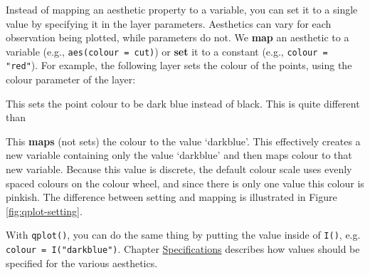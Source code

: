 
Instead of mapping an aesthetic property to a variable, you can set it
to a single value by specifying it in the layer parameters. Aesthetics
can vary for each observation being plotted, while parameters do not. We
\textbf{map} an aesthetic to a variable (e.g.,
\texttt{aes(colour = cut)}) or \textbf{set} it to a constant (e.g.,
\texttt{colour = "red"}). For example, the following layer sets the
colour of the points, using the colour parameter of the layer:

\begin{Shaded}
\begin{Highlighting}[]
\StringTok{ }
\StringTok{ }\NormalTok{(} \NormalTok{) }
\end{Highlighting}
\end{Shaded}

This sets the point colour to be dark blue instead of black. This is
quite different than

\begin{Shaded}
\begin{Highlighting}[]
\StringTok{ }\NormalTok{(}\NormalTok{(} \NormalTok{))}
\end{Highlighting}
\end{Shaded}

This \textbf{maps} (not sets) the colour to the value `darkblue'. This
effectively creates a new variable containing only the value `darkblue'
and then maps colour to that new variable. Because this value is
discrete, the default colour scale uses evenly spaced colours on the
colour wheel, and since there is only one value this colour is pinkish.
The difference between setting and mapping is illustrated in Figure
\ref{fig:qplot-setting}.

With \texttt{qplot()}, you can do the same thing by putting the value
inside of \texttt{I()}, e.g. \texttt{colour = I("darkblue")}. Chapter
\hyperref[cha:specifications]{Specifications} describes how values
should be specified for the various aesthetics. 

